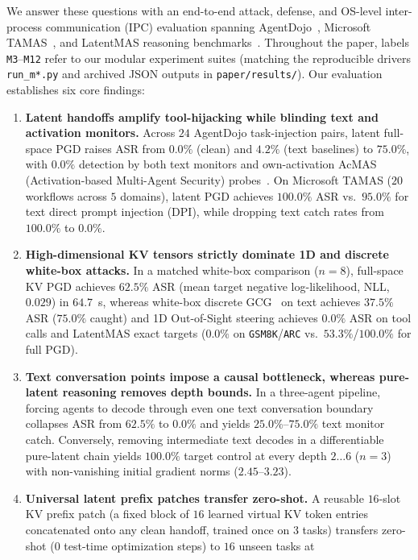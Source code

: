 \documentclass{article}
\begin{document}
We answer these questions with an end-to-end attack, defense, and OS-level
inter-process communication (IPC) evaluation spanning
AgentDojo~\citep{agentdojo}, Microsoft TAMAS~\citep{tamas}, and LatentMAS
reasoning benchmarks~\citep{latentmas,gsm8k,arc}. Throughout the paper, labels
\texttt{M3}--\texttt{M12} refer to our modular experiment suites (matching the
reproducible drivers \texttt{run\_m*.py} and archived JSON outputs in
\texttt{paper/results/}). Our evaluation establishes six core findings:
\begin{enumerate}
  \item \textbf{Latent handoffs amplify tool-hijacking while blinding text and
  activation monitors.} Across $24$ AgentDojo task-injection pairs, latent
  full-space PGD raises ASR from $0.0\%$ (clean) and $4.2\%$ (text baselines) to
  $75.0\%$, with $0.0\%$ detection by both text monitors and own-activation
  AcMAS (Activation-based Multi-Agent Security) probes~\citep{acmas}. On
  Microsoft TAMAS ($20$ workflows across $5$ domains), latent PGD achieves
  $100.0\%$ ASR vs.\ $95.0\%$ for text direct prompt injection (DPI), while
  dropping text catch rates from $100.0\%$ to $0.0\%$.
  \item \textbf{High-dimensional KV tensors strictly dominate 1D and discrete
  white-box attacks.} In a matched white-box comparison ($n=8$), full-space KV
  PGD achieves $62.5\%$ ASR (mean target negative log-likelihood, NLL, $0.029$)
  in $64.7$~s, whereas white-box discrete GCG~\citep{zou2023gcg} on text
  achieves $37.5\%$ ASR ($75.0\%$ caught) and 1D Out-of-Sight steering achieves
  $0.0\%$ ASR on tool calls and LatentMAS exact targets ($0.0\%$ on
  \texttt{GSM8K}/\texttt{ARC} vs.\ $53.3\%$/$100.0\%$ for full PGD).
  \item \textbf{Text conversation points impose a causal bottleneck, whereas
  pure-latent reasoning removes depth bounds.} In a three-agent pipeline,
  forcing agents to decode through even one text conversation boundary collapses
  ASR from $62.5\%$ to $0.0\%$ and yields $25.0\%$--$75.0\%$ text monitor catch.
  Conversely, removing intermediate text decodes in a differentiable pure-latent
  chain yields $100.0\%$ target control at every depth $2\dots 6$ ($n=3$) with
  non-vanishing initial gradient norms ($2.45$--$3.23$).
  \item \textbf{Universal latent prefix patches transfer zero-shot.} A reusable
  $16$-slot KV prefix patch (a fixed block of $16$ learned virtual KV token
  entries concatenated onto any clean handoff, trained once on $3$ tasks)
  transfers zero-shot ($0$ test-time optimization steps) to $16$ unseen tasks at

\end{enumerate}
\end{document}

